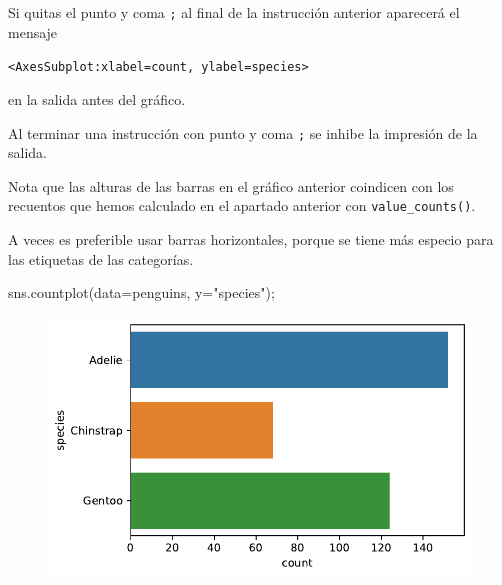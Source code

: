 \documentclass[
  a4paper,
  noprof,
  12pt,
  notoc,
  nosols,
  nobib]{mnye}
\newenvironment{Shaded}{\begin{snugshade}}{\end{snugshade}}
\newcommand{\NormalTok}[1]{\textcolor[rgb]{0.00,0.23,0.31}{#1}}
\newcommand{\OperatorTok}[1]{\textcolor[rgb]{0.37,0.37,0.37}{#1}}
\newcommand{\StringTok}[1]{\textcolor[rgb]{0.13,0.47,0.30}{#1}}
\theoremstyle{definition}
\theoremstyle{remark}
\begin{document}
\begin{tcolorbox}[enhanced jigsaw, arc=.35mm, colback=white, colframe=quarto-callout-note-color-frame, breakable, opacityback=0, bottomrule=.15mm, rightrule=.15mm, left=2mm, toprule=.15mm, leftrule=.75mm]
\begin{minipage}[t]{5.5mm}
\textcolor{quarto-callout-note-color}{\faInfo}
\end{minipage}%
\begin{minipage}[t]{\textwidth - 5.5mm}

Si quitas el punto y coma \texttt{;} al final de la instrucción anterior
aparecerá el mensaje

\texttt{\textless{}AxesSubplot:xlabel=\textquotesingle{}count\textquotesingle{},\ ylabel=\textquotesingle{}species\textquotesingle{}\textgreater{}}

en la salida antes del gráfico.

Al terminar una instrucción con punto y coma \texttt{;} se inhibe la
impresión de la salida.

\end{minipage}%
\end{tcolorbox}

Nota que las alturas de las barras en el gráfico anterior coindicen con
los recuentos que hemos calculado en el apartado anterior con
\texttt{value\_counts()}.

A veces es preferible usar barras horizontales, porque se tiene más
especio para las etiquetas de las categorías.

\begin{Shaded}
\begin{Highlighting}[]
\NormalTok{sns.countplot(data}\OperatorTok{=}\NormalTok{penguins, y}\OperatorTok{=}\StringTok{"species"}\NormalTok{)}\OperatorTok{;}
\end{Highlighting}
\end{Shaded}

\begin{figure}[tbph]

{\centering \includegraphics{chapters/1categorical_files/figure-pdf/cell-7-output-1.pdf}

}

\end{figure}
\end{document}
